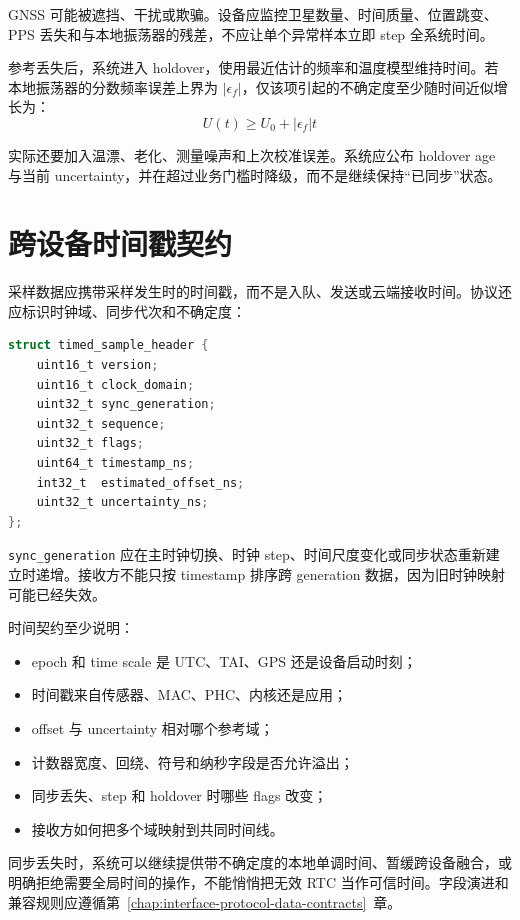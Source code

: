 GNSS 可能被遮挡、干扰或欺骗。设备应监控卫星数量、时间质量、位置跳变、PPS 丢失和与本地振荡器的残差，不应让单个异常样本立即 step 全系统时间。

参考丢失后，系统进入 holdover，使用最近估计的频率和温度模型维持时间。若本地振荡器的分数频率误差上界为 $\lvert\epsilon_f\rvert$，仅该项引起的不确定度至少随时间近似增长为：
\begin{equation}
  U(t) \ge U_0 + \lvert\epsilon_f\rvert t
\end{equation}

实际还要加入温漂、老化、测量噪声和上次校准误差。系统应公布 holdover age 与当前 uncertainty，并在超过业务门槛时降级，而不是继续保持“已同步”状态。

\section{跨设备时间戳契约}

采样数据应携带采样发生时的时间戳，而不是入队、发送或云端接收时间。协议还应标识时钟域、同步代次和不确定度：

\begin{lstlisting}[language=C,caption={带时钟质量信息的采样头}]
struct timed_sample_header {
    uint16_t version;
    uint16_t clock_domain;
    uint32_t sync_generation;
    uint32_t sequence;
    uint32_t flags;
    uint64_t timestamp_ns;
    int32_t  estimated_offset_ns;
    uint32_t uncertainty_ns;
};
\end{lstlisting}

\texttt{sync\_generation} 应在主时钟切换、时钟 step、时间尺度变化或同步状态重新建立时递增。接收方不能只按 timestamp 排序跨 generation 数据，因为旧时钟映射可能已经失效。

时间契约至少说明：

\begin{itemize}
  \item epoch 和 time scale 是 UTC、TAI、GPS 还是设备启动时刻；
  \item 时间戳来自传感器、MAC、PHC、内核还是应用；
  \item offset 与 uncertainty 相对哪个参考域；
  \item 计数器宽度、回绕、符号和纳秒字段是否允许溢出；
  \item 同步丢失、step 和 holdover 时哪些 flags 改变；
  \item 接收方如何把多个域映射到共同时间线。
\end{itemize}

同步丢失时，系统可以继续提供带不确定度的本地单调时间、暂缓跨设备融合，或明确拒绝需要全局时间的操作，不能悄悄把无效 RTC 当作可信时间。字段演进和兼容规则应遵循\mbox{第~\ref{chap:interface-protocol-data-contracts}~章}。

